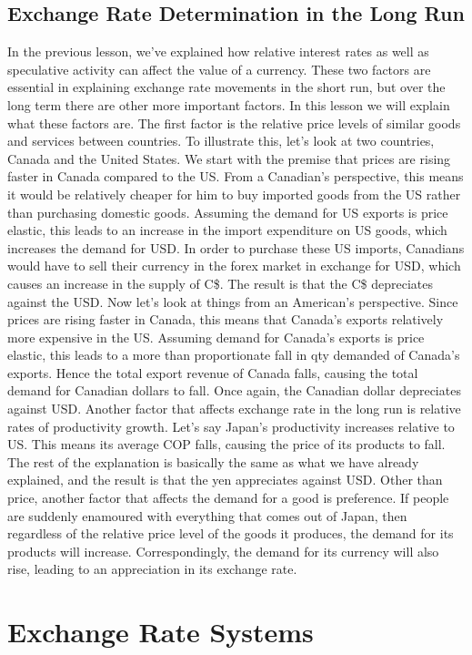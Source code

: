 \documentclass[DIV=classic,11pt,numbers=noenddot,listof=totoc,bibliography=totoc,parskip]{scrartcl}
\begin{document}
\subsection{Exchange Rate Determination in the Long Run}
In the previous lesson, we’ve explained how relative interest rates as well as speculative activity can affect the value of a currency. These two factors are essential in explaining exchange rate movements in the short run, but over the long term there are other more important factors. In this lesson we will explain what these factors are. The first factor is the relative price levels of similar goods and services between countries. To illustrate this, let’s look at two countries, Canada and the United States. We start with the premise that prices are rising faster in Canada compared to the US. From a Canadian’s perspective, this means it would be relatively cheaper for him to buy imported goods from the US rather than purchasing domestic goods. Assuming the demand for US exports is price elastic, this leads to an increase in the import expenditure on US goods, which increases the demand for USD. In order to purchase these US imports, Canadians would have to sell their currency in the forex market in exchange for USD, which causes an increase in the supply of C\$. The result is that the C\$ depreciates against the USD. Now let’s look at things from an American’s perspective. Since prices are rising faster in Canada, this means that Canada’s exports relatively more expensive in the US. Assuming demand for Canada’s exports is price elastic, this leads to a more than proportionate fall in qty demanded of Canada’s exports. Hence the total export revenue of Canada falls, causing the total demand for Canadian dollars to fall. Once again, the Canadian dollar depreciates against USD. Another factor that affects exchange rate in the long run is relative rates of productivity growth. Let’s say Japan’s productivity increases relative to US. This means its average COP falls, causing the price of its products to fall. The rest of the explanation is basically the same as what we have already explained, and the result is that the yen appreciates against USD. Other than price, another factor that affects the demand for a good is preference. If people are suddenly enamoured with everything that comes out of Japan, then regardless of the relative price level of the goods it produces, the demand for its products will increase. Correspondingly, the demand for its currency will also rise, leading to an appreciation in its exchange rate.
\newpage
\section{Exchange Rate Systems}
\end{document}
